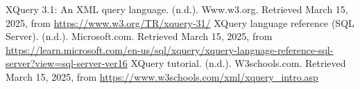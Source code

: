 \documentclass[twoside]{article}
\begin{document}
\begin{thebibliography}{9}
    XQuery 3.1: An XML query language. (n.d.). Www.w3.org. Retrieved March 15, 2025, from \url{https://www.w3.org/TR/xquery-31/}
    XQuery language reference (SQL Server). (n.d.). Microsoft.com. Retrieved March 15, 2025, from \url{https://learn.microsoft.com/en-us/sql/xquery/xquery-language-reference-sql-server?view=sql-server-ver16}
    XQuery tutorial. (n.d.). W3schools.com. Retrieved March 15, 2025, from \url{https://www.w3schools.com/xml/xquery_intro.asp}
\end{thebibliography}
\end{document}
